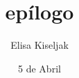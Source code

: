 \documentclass[a5paper,doc,12pt,apacite]{apa}
\title{epílogo}
\author{Elisa Kiseljak}
\affiliation{Tres historias europeas}
\date{5 de Abril}
\begin{document}
\maketitle



\nocite{Bosch}
 

\end{document}
